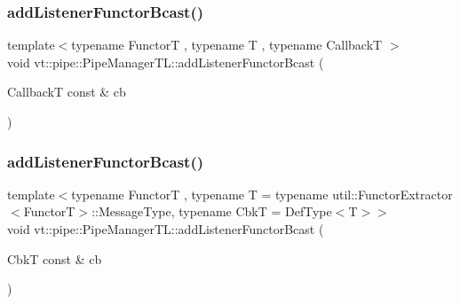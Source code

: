 \subsubsection{\texorpdfstring{add\+Listener\+Functor\+Bcast()}{addListenerFunctorBcast()}\hspace{0.1cm}{\footnotesize\ttfamily [1/2]}}
{\footnotesize\ttfamily template$<$typename FunctorT , typename T , typename CallbackT $>$ \\
void vt\+::pipe\+::\+Pipe\+Manager\+T\+L\+::add\+Listener\+Functor\+Bcast (\begin{DoxyParamCaption}\item[{CallbackT const \&}]{cb }\end{DoxyParamCaption})}

\mbox{\label{structvt_1_1pipe_1_1_pipe_manager_t_l_a3bbcc3d70bb6840ede74747011f18ea8}} 
\subsubsection{\texorpdfstring{add\+Listener\+Functor\+Bcast()}{addListenerFunctorBcast()}\hspace{0.1cm}{\footnotesize\ttfamily [2/2]}}
{\footnotesize\ttfamily template$<$typename FunctorT , typename T  = typename util\+::\+Functor\+Extractor$<$\+Functor\+T$>$\+::\+Message\+Type, typename CbkT  = Def\+Type$<$\+T$>$$>$ \\
void vt\+::pipe\+::\+Pipe\+Manager\+T\+L\+::add\+Listener\+Functor\+Bcast (\begin{DoxyParamCaption}\item[{CbkT const \&}]{cb }\end{DoxyParamCaption})}

\mbox{\label{structvt_1_1pipe_1_1_pipe_manager_t_l_a12039964ec1deb173f0ee83ad4c8a543}} 
